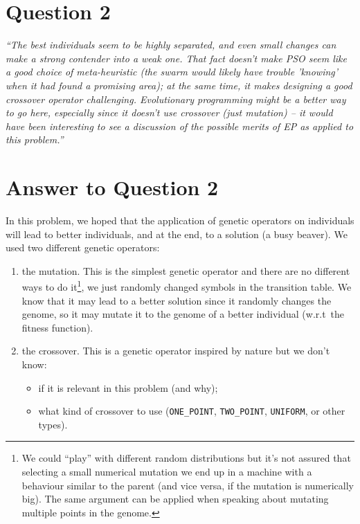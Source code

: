 \documentclass{report}
\begin{document}
\section*{Question 2}
\emph{``The best individuals seem to be highly separated, and even small
    changes can make a strong contender into a weak one. That fact
    doesn't make PSO seem like a good choice of meta-heuristic (the
    swarm would likely have trouble 'knowing' when it had found a
    promising area); at the same time, it makes designing a good
    crossover operator challenging. Evolutionary programming might be a
    better way to go here, especially since it doesn't use crossover
    (just mutation) -- it would have been interesting to see a
    discussion of the possible merits of EP as applied to this problem.''}

\section*{Answer to Question 2}

In this problem, we hoped that the application of genetic operators on individuals will lead to better individuals, and at the end, to a solution (a busy beaver).
We used two different genetic operators:
\begin{enumerate}
\item the mutation. This is the simplest genetic operator and there are no different ways to do it\footnote{We could ``play'' with different random distributions but it's not assured that selecting a small numerical mutation we end up in a machine with a behaviour similar to the parent (and vice versa, if the mutation is numerically big). The same argument can be applied when speaking about mutating multiple points in the genome.}, we just randomly changed symbols in the transition table. We know that it may lead to a better solution since it randomly changes the genome, so it may mutate it to the genome of a better individual (w.r.t\ the fitness function).
\item the crossover. This is a genetic operator inspired by nature but we don't know:
  \begin{itemize}
  \item if it is relevant in this problem (and why);
  \item what kind of crossover to use (\texttt{ONE\_POINT}, \texttt{TWO\_POINT}, \texttt{UNIFORM}, or other types).
  \end{itemize}
\end{enumerate}
\end{document}
